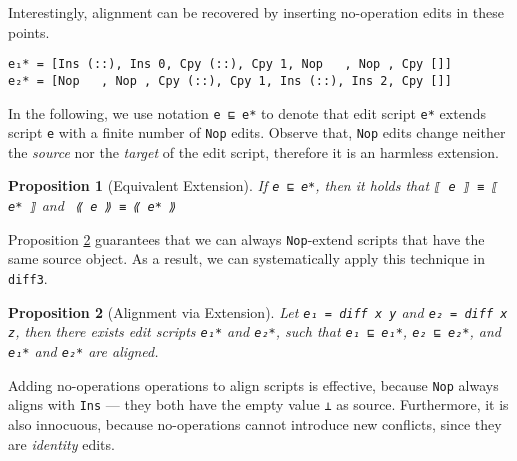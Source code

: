 \documentclass{sigplanconf}
\theoremstyle{plain}
\newtheorem{prop}{Proposition}
\begin{document}
Interestingly, alignment can be recovered by inserting no-operation
edits in these points.
\begin{verbatim}
e₁* = [Ins (::), Ins 0, Cpy (::), Cpy 1, Nop   , Nop , Cpy []]
e₂* = [Nop   , Nop , Cpy (::), Cpy 1, Ins (::), Ins 2, Cpy []] 
\end{verbatim}

In the following, we use notation \texttt{e ⊑ e*} to denote that edit
script \texttt{e*} extends script \texttt{e} with a finite number of
\texttt{Nop} edits.
%
Observe that, \texttt{Nop} edits change neither the \emph{source} nor the
\emph{target} of the edit script, therefore it is an harmless
extension.
\begin{prop}[Equivalent Extension]
  If \texttt{e ⊑ e*}, then it holds that \texttt{⟦ e ⟧ ≡ ⟦ e* ⟧} and
  \texttt{ ⟪ e ⟫ ≡ ⟪ e* ⟫}
\end{prop}

Proposition \ref{prop:align-ext} guarantees that we can always
\texttt{Nop}-extend scripts that have the same source object.
%
As a result, we can systematically apply this technique in
\texttt{diff3}.
%
\begin{prop}[Alignment via Extension]
\label{prop:align-ext}
  Let \texttt{e₁ = diff x y} and \texttt{e₂ = diff x z}, then there
  exists edit scripts \texttt{e₁*} and \texttt{e₂*}, such that
  \texttt{e₁ ⊑ e₁*}, \texttt{e₂ ⊑ e₂*}, and \texttt{e₁*} and
  \texttt{e₂*} are aligned.
\end{prop}
Adding no-operations operations to align scripts is effective, because
\texttt{Nop} always aligns with \texttt{Ins} --- they both have the
empty value \texttt{⊥} as source.
%
Furthermore, it is also innocuous, because no-operations cannot
introduce new conflicts, since they are \emph{identity} edits.



\end{document}
